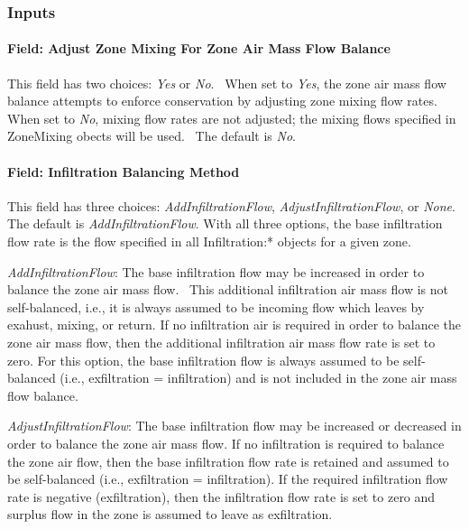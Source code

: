 \subsubsection{Inputs}\label{inputs-9-002}

\paragraph{Field: Adjust Zone Mixing For Zone Air Mass Flow Balance}\label{field-adjust-zone-mixing-for-zone-air-mass-flow-balance}

This field has two choices: \emph{Yes} or \emph{No}.~ When set to \emph{Yes}, the zone air mass flow balance attempts to enforce conservation by adjusting zone mixing flow rates. When set to \emph{No}, mixing flow rates are not adjusted; the mixing flows specified in ZoneMixing obects will be used.~ The default is \emph{No}.

\paragraph{Field: Infiltration Balancing Method}\label{field-infiltration-balancing-method}

This field has three choices: \emph{AddInfiltrationFlow}, \emph{AdjustInfiltrationFlow}, or \emph{None}. The default is \emph{AddInfiltrationFlow}. With all three options, the base infiltration flow rate is the flow specified in all Infiltration:* objects for a given zone.

\emph{AddInfiltrationFlow}: The base infiltration flow may be increased in order to balance the zone air mass flow.~ This additional infiltration air mass flow is not self-balanced, i.e., it is always assumed to be incoming flow which leaves by exahust, mixing, or return. If no infiltration air is required in order to balance the zone air mass flow, then the additional infiltration air mass flow rate is set to zero. For this option, the base infiltration flow is always assumed to be self-balanced (i.e., exfiltration = infiltration) and is not included in the zone air mass flow balance.

\emph{AdjustInfiltrationFlow}: The base infiltration flow may be increased or decreased in order to balance the zone air mass flow. If no infiltration is required to balance the zone air flow, then the base infiltration flow rate is retained and assumed to be self-balanced (i.e., exfiltration = infiltration). If the required infiltration flow rate is negative (exfiltration), then the infiltration flow rate is set to zero and surplus flow in the zone is assumed to leave as exfiltration.

